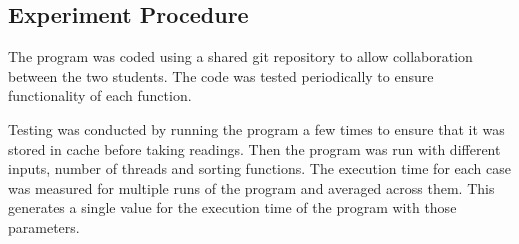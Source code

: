\subsection{Experiment Procedure}
The program was coded using a shared git repository to allow collaboration between the two students. The code was tested periodically to ensure functionality of each function.

Testing was conducted by running the program a few times to ensure that it was stored in cache before taking readings. Then the program was run with different inputs, number of threads and sorting functions. The execution time for each case was measured for multiple runs of the program and averaged across them. This generates a single value for the execution time of the program with those parameters.
